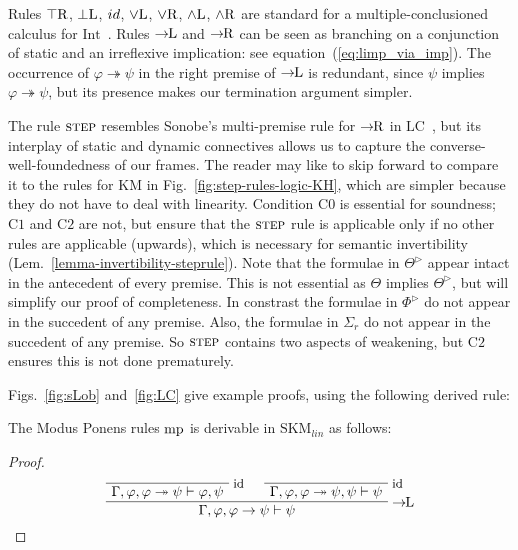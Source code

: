 \documentclass[envcountsect,envcountsame]{llncs}
\newcommand{\condzero}{\mathrm{C0}}
\newcommand{\condone}{\mathrm{C1}}
\newcommand{\condtwo}{\mathrm{C2}}
\newcommand{\eqref}[1]{(\ref{#1})}
\newcommand{\iimp}{\twoheadrightarrow}
\newcommand{\lgint}{\mathrm{Int}}
\newcommand{\lgkm}{\mathrm{KM}}
\newcommand{\lglc}{\mathrm{LC}}
\newcommand{\limp}{\rightarrow}
\newcommand{\mprulename}{\small mp}
\newcommand{\nxt}{\rhd}
\newcommand{\opset}[2]{{#2}^{#1}}
\newcommand{\seq}{\vdash}
\newcommand{\seqlcnxt}{\mathrm{SKM}_{lin}}
\newcommand{\toprightrulename}{\small \top \mathrm{R}}
\newcommand{\idrulename}{\small id}
\newcommand{\botleftrulename}{\small \bot \mathrm{L}}
\newcommand{\orleftrulename}{\small \lor \mathrm{L}}
\newcommand{\orrightrulename}{\small \lor \mathrm{R}}
\newcommand{\andrightrulename}{\small \land \mathrm{R}}
\newcommand{\andleftrulename}{\small \land \mathrm{L}}
\newcommand{\impleftrulename}{\small \limp\!\!\mathrm{L}}
\newcommand{\imprightrulename}{\small \limp\!\!\mathrm{R}}
\newcommand{\steprulename}{\textsc{step}}
\newcommand{\newsteprulename}{\textsc{step}}
\begin{document}
Rules $\toprightrulename$, $\botleftrulename$, $\idrulename$,
$\orleftrulename$, $\orrightrulename$, $\andleftrulename$,
$\andrightrulename$ are standard for a multiple-conclusioned calculus
for $\lgint$~\cite{troelstra-schwichtenberg-basic}.  Rules
$\impleftrulename$ and $\imprightrulename$ can be seen as branching on
a conjunction of static and an irreflexive
implication: see equation~\eqref{eq:limp_via_imp}.
The occurrence of 
$\varphi\iimp\psi$
in the right premise of $\impleftrulename$ is redundant, since 
$\psi$ implies $\varphi\iimp\psi$, but its presence makes our
termination argument simpler.

The rule $\steprulename$ resembles Sonobe's multi-premise rule for
$\imprightrulename$ in $\lglc$~\cite{Sonobe:Gentzen,Corsi:Semantic},
but its interplay of static and dynamic connectives allows us to
capture the converse-well-foundedness of our frames.  The reader may
like to skip forward to compare it to the rules for $\lgkm$ in
Fig.~\ref{fig:step-rules-logic-KH}, which are simpler because they do
not have to deal with linearity. Condition $\condzero$ is essential
for soundness; $\condone$ and $\condtwo$ are not, but ensure that the
$\newsteprulename$ rule is applicable only if no other rules are
applicable (upwards), which is necessary for semantic invertibility
(Lem.~\ref{lemma-invertibility-steprule}).  Note that the formulae in
$\opset{\nxt}{\Theta}$ appear intact in the antecedent of every
premise. This is not essential as $\Theta$ implies
$\opset{\nxt}{\Theta}$, but will simplify our proof of
completeness. In constrast the formulae in $\opset{\nxt}{\Phi}$ do not
appear in the succedent of any premise. Also, the formulae in
$\Sigma_r$ do not appear in the succedent of any premise. So
$\newsteprulename$ contains two aspects of weakening, but $\condtwo$
ensures this is not done prematurely.

Figs.~\ref{fig:sLob} and~\ref{fig:LC} give example proofs,
using the following derived rule:

\begin{lemma}\label{Lem:MP}
  The Modus Ponens rules $\mathrm{\small \mprulename}$ 
  is derivable in $\seqlcnxt$ as follows:
\end{lemma}
\begin{proof}
  \[
  \AxiomC{}
  \RightLabel{\idrulename}
 \UnaryInfC{$\Gamma,\varphi,\varphi\iimp\psi \seq \varphi,\psi$}
 \AxiomC{}
  \RightLabel{\idrulename}
 \UnaryInfC{$\Gamma,\varphi,\varphi\iimp\psi,\psi \seq\psi$}
  \RightLabel{$\impleftrulename$}
 \BinaryInfC{$\Gamma,\varphi,\varphi\limp\psi \seq \psi$}
 \DisplayProof
  \]
\end{proof}
\end{document}
